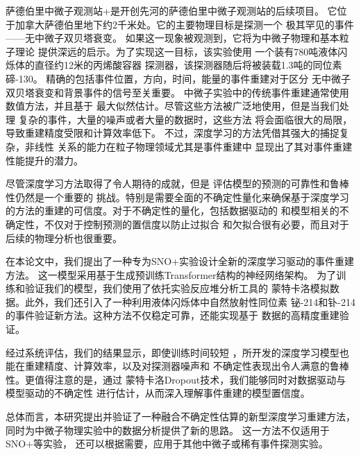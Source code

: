 \begin{cnabstract}
萨德伯里中微子观测站+是开创先河的萨德伯里中微子观测站的后续项目。
它位于加拿大萨德伯里地下约2千米处。它的主要物理目标是探测一个
极其罕见的事件——无中微子双贝塔衰变。
如果这一现象被观测到，它将为中微子物理和基本粒子理论
提供深远的启示。为了实现这一目标，该实验使用
一个装有780吨液体闪烁体的直径约12米的丙烯酸容器
探测器，该探测器随后将被装载1.3吨的同位素碲-130。
精确的包括事件位置，方向，时间，能量的事件重建对于区分
无中微子双贝塔衰变和背景事件的信号至关重要。
中微子实验中的传统事件重建通常使用数值方法，并且基于
最大似然估计。尽管这些方法被广泛地使用，但是当我们处理
复杂的事件，大量的噪声或者大量的数据时，这些方法
将会面临很大的局限，导致重建精度受限和计算效率低下。
不过，深度学习的方法凭借其强大的捕捉复杂，非线性
关系的能力在粒子物理领域尤其是事件重建中
显现出了其对事件重建性能提升的潜力。

尽管深度学习方法取得了令人期待的成就，但是
评估模型的预测的可靠性和鲁棒性仍然是一个重要的
挑战。特别是需要全面的不确定性量化来确保基于深度学习
的方法的重建的可信度。对于不确定性的量化，包括数据驱动的
和模型相关的不确定性，不仅对于控制预测的置信度以防止过拟合
和欠拟合很有必要，而且对于后续的物理分析也很重要。

在本论文中，我们提出了一种专为SNO+实验设计全新的深度学习驱动的事件重建方法。
这一模型采用基于生成预训练Transformer结构的神经网络架构。
为了训练和验证我们的模型，我们使用了依托实验反应堆分析工具的
蒙特卡洛模拟数据。此外，我们还引入了一种利用液体闪烁体中自然放射性同位素
铋-214和钋-214的事件验证新方法。这种方法不仅稳定可靠，还能实现基于
数据的高精度重建验证。

经过系统评估，我们的结果显示，即使训练时间较短
，所开发的深度学习模型也能在重建精度、计算效率，以及对探测器噪声和
不确定性表现出令人满意的鲁棒性。更值得注意的是，通过
蒙特卡洛Dropout技术，我们能够同时对数据驱动与模型驱动的不确定性
进行估计，从而深入理解事件重建的模型置信度。

总体而言，本研究提出并验证了一种融合不确定性估算的新型深度学习重建方法，
同时为中微子物理实验中的数据分析提供了新的思路。
这一方法不仅适用于SNO+等实验，
还可以根据需要，应用于其他中微子或稀有事件探测实验。




\end{cnabstract}

